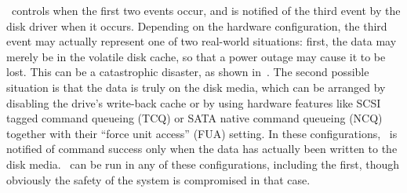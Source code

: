 \Kudos\ controls when the first two events occur, and is notified of the third
event by the disk driver when it occurs. Depending on the hardware
configuration, the third event may actually represent one of two real-world
situations: first, the data may merely be in the volatile disk cache, so that a
power outage may cause it to be lost. This can be a catastrophic disaster, as
shown in~\cite{nightingale06rethink}. The second possible situation is that the
data is truly on the disk media, which can be arranged by disabling the drive's
write-back cache or by using hardware features like SCSI tagged command queueing
(TCQ) or SATA native command queueing (NCQ) together with their ``force unit
access'' (FUA) setting. In these configurations, \Kudos\ is notified of command
success only when the data has actually been written to the disk media. \Kudos\
can be run in any of these configurations, including the first, though obviously
the safety of the system is compromised in that case.

